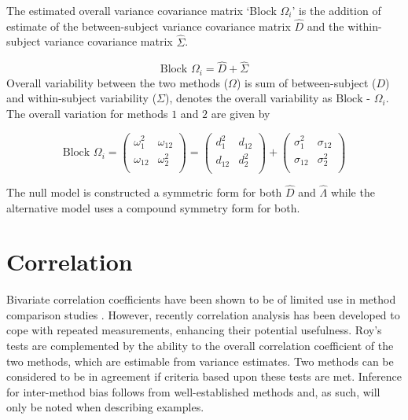 \documentclass[12pt, a4paper]{report}
\theoremstyle{plain}
\theoremstyle{definition}
\theoremstyle{remark}
\begin{document}
	The estimated overall variance covariance matrix `Block
	$\Omega_{i}$' is the addition of estimate of the between-subject variance covariance matrix $\hat{D}$ and the within-subject variance covariance matrix $\hat{\Sigma}$.
	
	\begin{equation}
		\mbox{Block  }\Omega_{i} = \hat{D} + \hat{\Sigma}
	\end{equation}
	Overall variability between the two methods ($\Omega$) is sum of between-subject ($D$) and within-subject variability ($\Sigma$),
	\citet{ARoy2009} denotes the overall variability as ${\mbox{Block - } \Omega_{i}}$. The overall variation for methods $1$ and $2$ are given by
	
	\begin{center}
		\[\mbox{Block } {\Omega}_i = \left(\begin{array}{cc}
		\omega^2_1  & \omega_{12} \\
		\omega_{12} & \omega^2_2 \\
		\end{array}  \right)
		=  \left(
		\begin{array}{cc}
		d^2_1  & d_{12} \\
		d_{12} & d^2_2 \\
		\end{array} \right)+
		\left(
		\begin{array}{cc}
		\sigma^2_1  & \sigma_{12} \\
		\sigma_{12} & \sigma^2_2 \\
		\end{array}\right)
		\]
	\end{center}
	

	
	The null model is constructed a symmetric form for both ${\hat{D}}$ and ${\hat{\Lambda}}$ while the alternative model uses a compound symmetry form for both.


\section{Correlation}
Bivariate correlation coefficients have been shown to be of limited use in method comparison studies \citep{BA86}. However,
recently correlation analysis has been developed to cope with repeated measurements, enhancing their potential usefulness.
Roy's tests are complemented by the ability to the overall correlation coefficient of the two methods, which are estimable from variance estimates. Two methods can be considered to be in agreement if criteria based upon these tests are met. Inference for inter-method bias follows from well-established methods and, as such, will only be noted when describing examples.
\end{document}
